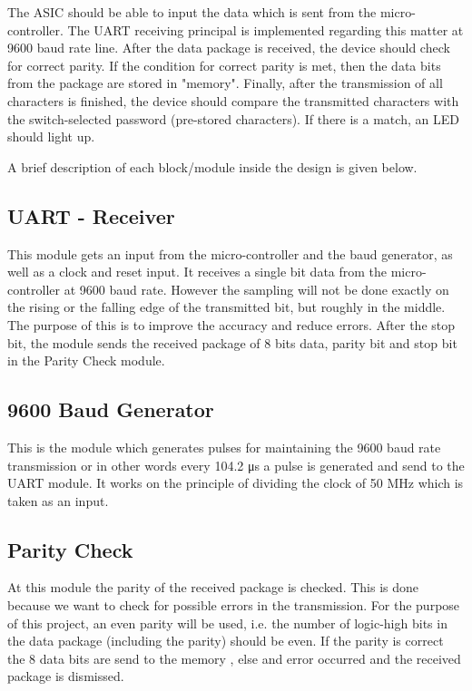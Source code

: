 \documentclass[a4paper, twoside]{report}
\begin{document}
\noindent The ASIC should be able to input the data which is sent from the micro-controller. The UART receiving principal is implemented regarding this matter at 9600 baud rate line. After the data package is received, the device should check for correct parity. If the condition for correct parity is met, then the data bits from the package are stored in "memory". Finally, after the transmission of all characters is finished, the device should compare the transmitted characters with the switch-selected password (pre-stored characters). If there is a match, an LED should light up.  \\ \par

\noindent A brief description of each block/module inside the design is given below. \\ \par

\subsection{UART - Receiver}
\noindent This module gets an input from the micro-controller and the baud generator, as well as a clock and reset input. It receives a single bit data from the micro-controller at 9600 baud rate. However the sampling will not be done exactly on the rising or the falling edge of the transmitted bit, but roughly in the middle. The purpose of this is to improve the accuracy and reduce errors. After the stop bit, the module sends the received package of 8 bits data, parity bit and stop bit in the Parity Check module. \\ \par
\subsection{9600 Baud Generator}
\noindent This is the module which generates pulses for maintaining the 9600 baud rate transmission or in other words every 104.2 \si{\micro\second} a pulse is generated and send to the UART module. It works on the principle of dividing the clock of 50 \si{\mega\hertz} which is taken as an input.\\ \par
\subsection{Parity Check}
\noindent At this module the parity of the received package is checked. This is done because we want to check for possible errors in the transmission. For the purpose of this project, an even parity will be used, i.e. the number of logic-high bits in the data package (including the parity) should be even. If the parity is correct the 8 data bits are send to the memory , else and error occurred and the received package is dismissed.\\ \par
\end{document}
